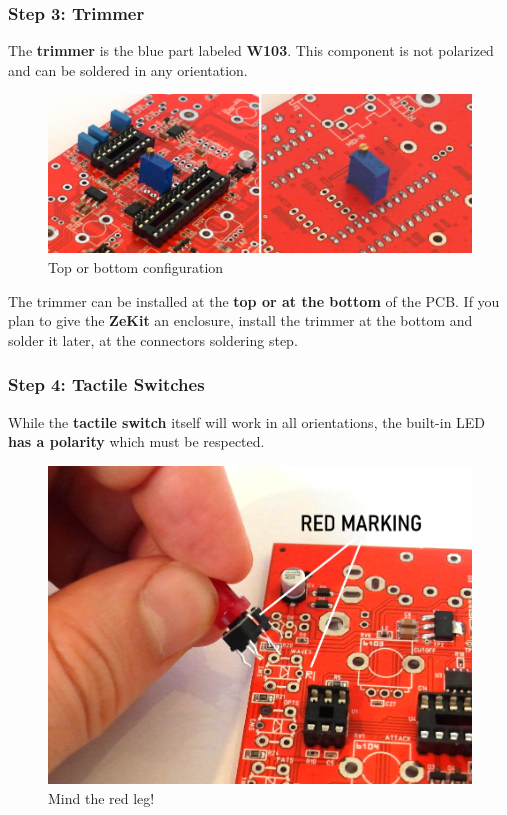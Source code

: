 \documentclass{scrartcl}
\begin{document}
\subsubsection{Step 3: Trimmer}

The \textbf{trimmer} is the blue part labeled \textbf{W103}. This component is not polarized and can be soldered in any orientation.

\begin{figure}[!ht]
    \begin{center}
        \includegraphics[scale=0.35]{assets/pcb-trimmer.jpg}
        \caption{Top or bottom configuration}
    \end{center}
\end{figure}

The trimmer can be installed at the \textbf{top or at the bottom} of the PCB. If you plan to give the \textbf{ZeKit} an enclosure, install the trimmer at the bottom and solder it later, at the connectors soldering step.

\subsubsection{Step 4: Tactile Switches}

While the \textbf{tactile switch} itself will work in all orientations, the built-in LED \textbf{has a polarity} which must be respected.

\begin{figure}[!ht]
    \begin{center}
        \includegraphics[scale=0.30]{assets/tact-marking.jpg}
        \caption{Mind the red leg!}
    \end{center}
\end{figure}
\end{document}
